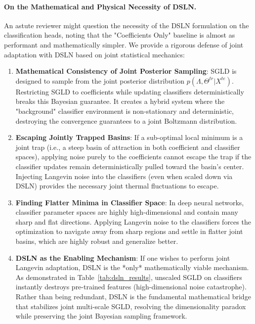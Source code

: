 \paragraph{On the Mathematical and Physical Necessity of DSLN.} An astute reviewer might question the necessity of the DSLN formulation on the classification heads, noting that the "Coefficients Only" baseline is almost as performant and mathematically simpler.
We provide a rigorous defense of joint adaptation with DSLN based on joint statistical mechanics:
\begin{enumerate}
\item \textbf{Mathematical Consistency of Joint Posterior Sampling}: SGLD is designed to sample from the joint posterior distribution $p(\Lambda, \Theta^{tr} | X^{te})$.
Restricting SGLD to coefficients while updating classifiers deterministically breaks this Bayesian guarantee.
It creates a hybrid system where the "background" classifier environment is non-stationary and deterministic, destroying the convergence guarantees to a joint Boltzmann distribution.
\item \textbf{Escaping Jointly Trapped Basins}: If a sub-optimal local minimum is a joint trap (i.e., a steep basin of attraction in both coefficient and classifier spaces), applying noise purely to the coefficients cannot escape the trap if the classifier updates remain deterministically pulled toward the basin's center.
Injecting Langevin noise into the classifiers (even when scaled down via DSLN) provides the necessary joint thermal fluctuations to escape.
\item \textbf{Finding Flatter Minima in Classifier Space}: In deep neural networks, classifier parameter spaces are highly high-dimensional and contain many sharp and flat directions.
Applying Langevin noise to the classifiers forces the optimization to navigate away from sharp regions and settle in flatter joint basins, which are highly robust and generalize better.
\item \textbf{DSLN as the Enabling Mechanism}: If one wishes to perform joint Langevin adaptation, DSLN is the *only* mathematically viable mechanism.
As demonstrated in Table~\ref{tab:dsln_results}, unscaled SGLD on classifiers instantly destroys pre-trained features (high-dimensional noise catastrophe).
Rather than being redundant, DSLN is the fundamental mathematical bridge that stabilizes joint multi-scale SGLD, resolving the dimensionality paradox while preserving the joint Bayesian sampling framework.
\end{enumerate}

